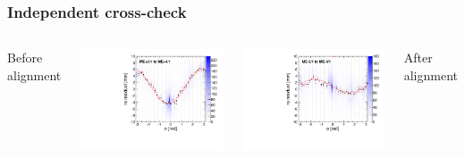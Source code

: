 \documentclass[compress]{beamer}
\begin{document}
\begin{frame}
\frametitle{Independent cross-check}

\begin{columns}
\begin{columns}
\centering Before alignment

\includegraphics[width=\linewidth]{BHCrossCheck_mep41_before.pdf}

\includegraphics[width=\linewidth]{BHCrossCheck_mem41_before.pdf}

\centering After alignment


\end{columns}
\end{columns}
\end{frame}
\end{document}

